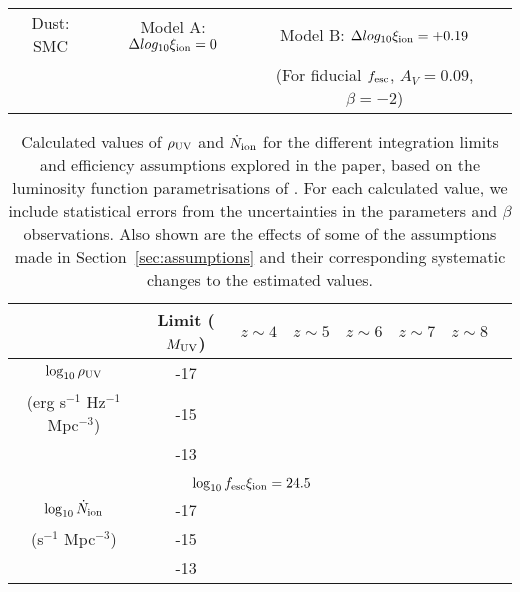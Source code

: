 \begin{table}
\begin{tabular}{cc|cccccc}
	 	 \multicolumn{2}{c}{Dust: SMC \citep{Pei:1992ey}} &  \multicolumn{2}{c}{Model A: $\Delta log_{10}\xi_{\rm{ion}} = 0$} & \multicolumn{3}{c}{Model B: $\Delta log_{10}\xi_{\rm{ion}} = +0.19$} \\
	 	 \multicolumn{2}{c}{} &  \multicolumn{2}{c}{} & \multicolumn{3}{c}{(For fiducial $f_{\rm{esc}}$, $A_{V} = 0.09$, $\beta = -2$)}


  \end{tabular}
  \label{tab:bouwens_N}
\end{table}

\begin{table}
  \caption[Calculated values of $\rho_{\rm{UV}}$ and $\dot{N}_{\rm{ion}}$ for the different integration limits and efficiency assumptions explored in the paper, based on the luminosity function parametrisations of \citet{Finkelstein:2014ub}.]{Calculated values of $\rho_{\rm{UV}}$ and $\dot{N}_{\rm{ion}}$ for the different integration limits and efficiency assumptions explored in the paper, based on the luminosity function parametrisations of \citet{Finkelstein:2014ub}. For each calculated value, we include statistical errors from the uncertainties in the \citet{Schechter:1976gl} parameters and $\beta$ observations. Also shown are the effects of some of the assumptions made in Section~\ref{sec:assumptions} and their corresponding systematic changes to the estimated values.}
  \scriptsize
  \begin{tabular}{cc|cccccc}
   \hline
   & Limit ($M_{\rm{UV}}$) & $z\sim4$ & $z\sim5$ & $z\sim6$ & $z\sim7$ & $z\sim8$ \\
   \hline
  $\log_{10} \rho_{\rm{UV}}$ 							& -17 &  \\
   (erg s$^{-1}$ Hz$^{-1}$ Mpc$^{-3}$)	& -15 &  \\
																& -13 &  \\

	 \multicolumn{7}{c}{}\\
	 \multicolumn{7}{c}{$\log_{10}f_{\rm{esc}}\xi_{\rm{ion}} = 24.5$}\\\hline
$\log_{10} \dot{N}_{\rm{ion}}$	 		& -17 &  \\
(s$^{-1}$ Mpc$^{-3}$) 				& -15 &  \\
												& -13 &  \\
												

\end{tabular}
\end{table}
